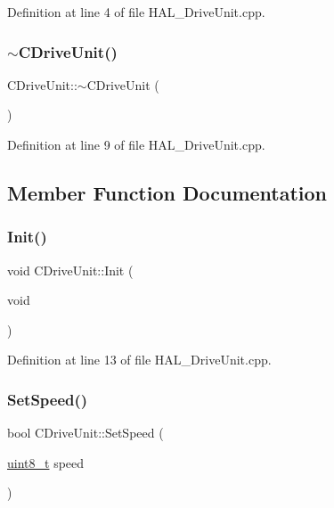 Definition at line 4 of file H\+A\+L\+\_\+\+Drive\+Unit.\+cpp.

\mbox{\label{class_c_drive_unit_add2dcafc20d8e30ddc8ee2affb5085ee}} 
\subsubsection{\texorpdfstring{$\sim$CDriveUnit()}{~CDriveUnit()}}
{\footnotesize\ttfamily C\+Drive\+Unit\+::$\sim$\+C\+Drive\+Unit (\begin{DoxyParamCaption}{ }\end{DoxyParamCaption})}



Definition at line 9 of file H\+A\+L\+\_\+\+Drive\+Unit.\+cpp.



\subsection{Member Function Documentation}
\mbox{\label{class_c_drive_unit_ab7b775c0f68db1490ecf8a726dbe786d}} 
\subsubsection{\texorpdfstring{Init()}{Init()}}
{\footnotesize\ttfamily void C\+Drive\+Unit\+::\+Init (\begin{DoxyParamCaption}\item[{void}]{ }\end{DoxyParamCaption})}



Definition at line 13 of file H\+A\+L\+\_\+\+Drive\+Unit.\+cpp.

\mbox{\label{class_c_drive_unit_a06ffeb71565bc8edabadae09157c705e}} 
\subsubsection{\texorpdfstring{SetSpeed()}{SetSpeed()}}
{\footnotesize\ttfamily bool C\+Drive\+Unit\+::\+Set\+Speed (\begin{DoxyParamCaption}\item[{\mbox{\hyperlink{_a_d_a_s___types_8h_aba7bc1797add20fe3efdf37ced1182c5}{uint8\+\_\+t}}}]{speed }\end{DoxyParamCaption})}



